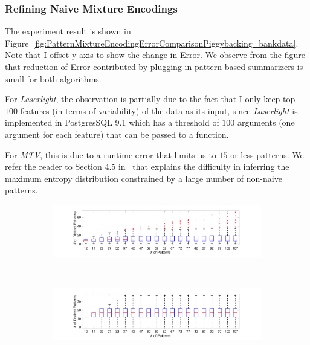 \subsubsection{Refining Naive Mixture Encodings}
\label{sec:refiningnaivemixtureencodings}
The experiment result is shown in Figure~\ref{fig:PatternMixtureEncodingErrorComparisonPiggybacking_bankdata}.
Note that I offset y-axis to show the change in Error.
We observe from the figure that reduction of Error contributed by plugging-in pattern-based summarizers is small for both algorithms.

For \textit{Laserlight}, the observation is partially due to the fact that I only keep top $100$ features (in terms of variability) of the data as its input, since \textit{Laserlight} is implemented in PostgresSQL 9.1 which has a threshold of $100$ arguments (one argument for each feature) that can be passed to a function.

For \textit{MTV}, this is due to a runtime error that limits us to $15$ or less patterns.
We refer the reader to Section 4.5 in~\cite{DBLP:journals/tkdd/MampaeyVT12} that explains the difficulty in inferring the maximum entropy distribution constrained by a large number of non-naive patterns.

\begin{figure}[ht!]
	\captionsetup[subfigure]{justification=centering}
    \centering
    \begin{subfigure}[b]{0.48\textwidth}
        \centering       \includegraphics[width=\textwidth]{QueryLogSummarization/graphics/Laserlight_NumDistinctPatternsVNumPatterns.pdf}
       \label{fig:patterns_laserlight}
\end{subfigure}
    ~
\begin{subfigure}[b]{0.48\textwidth}
  \centering       
  \includegraphics[width=\textwidth]{QueryLogSummarization/graphics/MTV_NumDistinctPatternsVNumPatterns.pdf}
 \label{fig:patterns_MTV}
\end{subfigure}
~
   \label{fig:distinctpatternsofpatternbasedalgorithms}
\trimfigurewhitespace
\end{figure}

